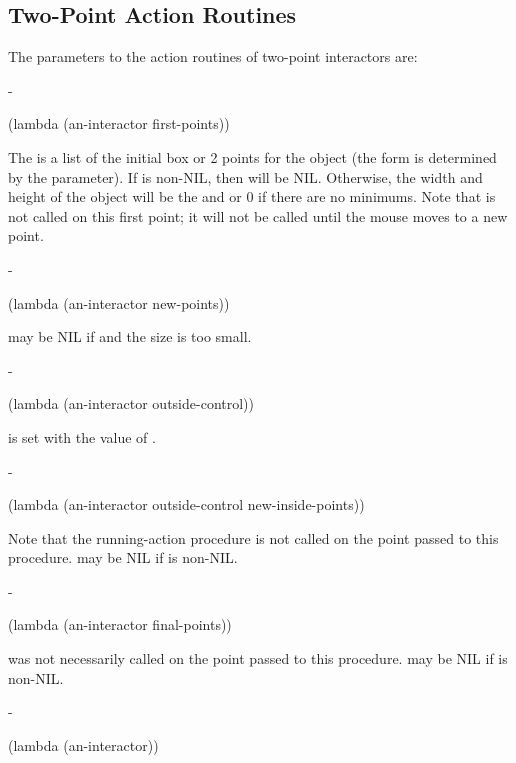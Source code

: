 \subsection{Two-Point Action Routines}
\label{twopcustomaction}

The parameters to the action routines of two-point interactors are:

\begin{description}

 -
\begin{programinlist}
(lambda (an-interactor first-points))
\end{programinlist}
The  is a list of the initial box or 2 points for the object
(the form is determined by the  parameter).  If
 is non-NIL, then  will be NIL.
Otherwise, the width and height of the object will be the  and
 or 0 if there are no minimums.
Note that  is not
called on this first point; it will not be called
until the mouse moves to a new point.



 -
\begin{programinlist}
(lambda (an-interactor new-points))
\end{programinlist}
 may be NIL if  and
the size is too small.



 -
\begin{programinlist}
(lambda (an-interactor outside-control))
\end{programinlist}
 is set with the value of .



 -
\begin{programinlist}
(lambda (an-interactor outside-control new-inside-points))
\end{programinlist}
Note that the running-action procedure is not called on the point passed to this
procedure.   may be NIL if 
is non-NIL.



 -
\begin{programinlist}
(lambda (an-interactor final-points))
\end{programinlist}
 was not
necessarily called on the point passed to this procedure.
 may be NIL if  is non-NIL.



 -
\begin{programinlist}
(lambda (an-interactor))
\end{programinlist}


\end{description}


